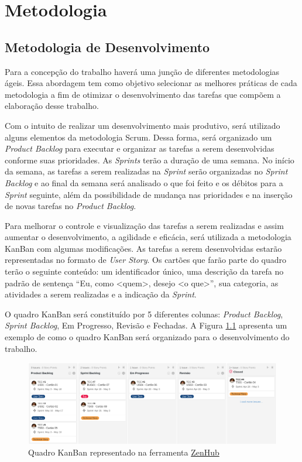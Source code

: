 \chapter[Metodologia]{Metodologia}

\section{Metodologia de Desenvolvimento}

Para a concepção do trabalho haverá uma junção de diferentes metodologias ágeis. Essa abordagem tem como objetivo selecionar as melhores práticas de cada metodologia a fim de otimizar o desenvolvimento das tarefas que compõem a elaboração desse trabalho.  

Com o intuito de realizar um desenvolvimento mais produtivo, será utilizado alguns elementos da metodologia Scrum. Dessa forma, será organizado um \textit{Product Backlog} para executar e organizar as tarefas a serem desenvolvidas conforme suas prioridades. As \textit{Sprints} terão a duração de uma semana. No início da semana, as tarefas a serem realizadas na \textit{Sprint} serão organizadas no \textit{Sprint Backlog} e ao final da semana será analisado o que foi feito e os débitos para a \textit{Sprint} seguinte, além da possibilidade de mudança nas prioridades e na inserção de novas tarefas no \textit{Product Backlog}. 

Para melhorar o controle e visualização das tarefas a serem realizadas e assim aumentar o desenvolvimento, a agilidade e eficácia, será utilizada a metodologia KanBan com algumas modificações. As tarefas a serem desenvolvidas estarão representadas no formato de \textit{User Story}. Os cartões que farão parte do quadro terão o seguinte conteúdo: um identificador único, uma descrição da tarefa no padrão de sentença ``Eu, como <quem>, desejo <o que>'', sua categoria, as atividades a serem realizadas e a indicação da \textit{Sprint}.

O quadro KanBan será constituído por 5 diferentes colunas: \textit{Product Backlog}, \textit{Sprint Backlog}, Em Progresso, Revisão e Fechadas. A Figura \ref{quadroKanBan} apresenta um exemplo de como o quadro KanBan será organizado para o desenvolvimento do trabalho. 

\begin{figure}[h]
	\centering
	\includegraphics[keepaspectratio=true,scale=0.375]{figuras/kanban.png}
	\caption{Quadro KanBan representado na ferramenta \href{https://www.zenhub.com/}{ZenHub}}
	\label{quadroKanBan}
\end{figure}

